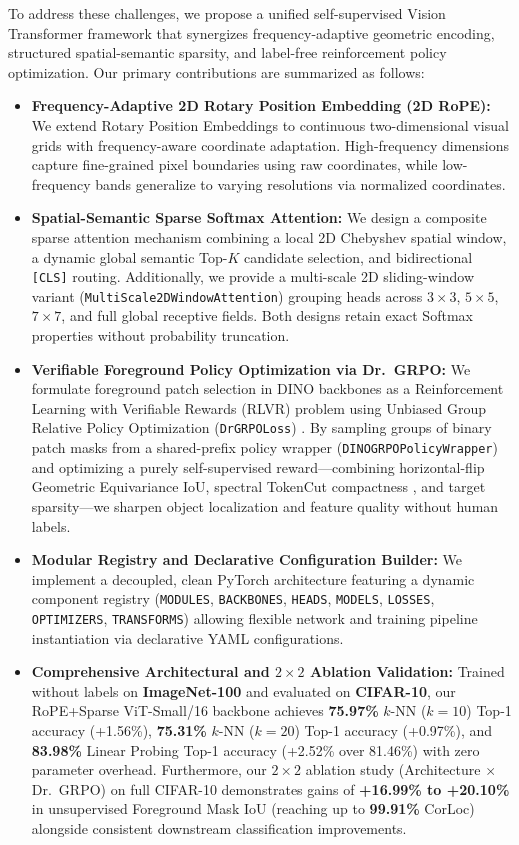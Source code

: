 \documentclass[11pt,a4paper]{article}
\begin{document}
To address these challenges, we propose a unified self-supervised Vision Transformer framework that synergizes frequency-adaptive geometric encoding, structured spatial-semantic sparsity, and label-free reinforcement policy optimization. Our primary contributions are summarized as follows:
\begin{itemize}[leftmargin=*]
    \item \textbf{Frequency-Adaptive 2D Rotary Position Embedding (2D RoPE):} We extend Rotary Position Embeddings \cite{su2024roformer} to continuous two-dimensional visual grids with frequency-aware coordinate adaptation. High-frequency dimensions capture fine-grained pixel boundaries using raw coordinates, while low-frequency bands generalize to varying resolutions via normalized coordinates.
    \item \textbf{Spatial-Semantic Sparse Softmax Attention:} We design a composite sparse attention mechanism combining a local 2D Chebyshev spatial window, a dynamic global semantic Top-$K$ candidate selection, and bidirectional \texttt{[CLS]} routing. Additionally, we provide a multi-scale 2D sliding-window variant (\texttt{MultiScale2DWindowAttention}) grouping heads across $3\times 3$, $5\times 5$, $7\times 7$, and full global receptive fields. Both designs retain exact Softmax properties without probability truncation.
    \item \textbf{Verifiable Foreground Policy Optimization via Dr.\ GRPO:} We formulate foreground patch selection in DINO backbones as a Reinforcement Learning with Verifiable Rewards (RLVR) problem using Unbiased Group Relative Policy Optimization (\texttt{DrGRPOLoss}) \cite{shao2024deepseekmath, liu2025drgrpo}. By sampling groups of binary patch masks from a shared-prefix policy wrapper (\texttt{DINOGRPOPolicyWrapper}) and optimizing a purely self-supervised reward—combining horizontal-flip Geometric Equivariance IoU, spectral TokenCut compactness \cite{wang2022tokencut}, and target sparsity—we sharpen object localization and feature quality without human labels.
    \item \textbf{Modular Registry and Declarative Configuration Builder:} We implement a decoupled, clean PyTorch architecture featuring a dynamic component registry (\texttt{MODULES}, \texttt{BACKBONES}, \texttt{HEADS}, \texttt{MODELS}, \texttt{LOSSES}, \texttt{OPTIMIZERS}, \texttt{TRANSFORMS}) allowing flexible network and training pipeline instantiation via declarative YAML configurations.
    \item \textbf{Comprehensive Architectural and $2\times 2$ Ablation Validation:} Trained without labels on \textbf{ImageNet-100} and evaluated on \textbf{CIFAR-10}, our RoPE+Sparse ViT-Small/16 backbone achieves \textbf{75.97\%} $k$-NN ($k=10$) Top-1 accuracy (+1.56\%), \textbf{75.31\%} $k$-NN ($k=20$) Top-1 accuracy (+0.97\%), and \textbf{83.98\%} Linear Probing Top-1 accuracy (+2.52\% over 81.46\%) with zero parameter overhead. Furthermore, our $2\times 2$ ablation study (Architecture $\times$ Dr.\ GRPO) on full CIFAR-10 demonstrates gains of \textbf{+16.99\% to +20.10\%} in unsupervised Foreground Mask IoU (reaching up to \textbf{99.91\%} CorLoc) alongside consistent downstream classification improvements.
\end{itemize}
\end{document}
